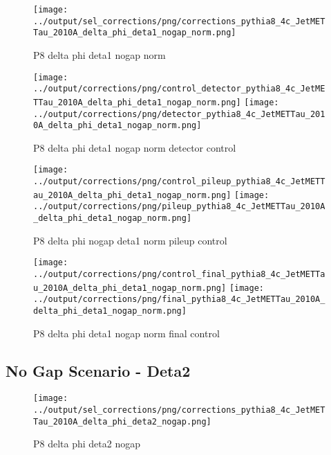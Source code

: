 \documentclass[11pt]{book}
\begin{document}
\begin{figure}[ht]
\centering
\texttt{[image: ../output/sel\_corrections/png/corrections\_pythia8\_4c\_JetMETTau\_2010A\_delta\_phi\_deta1\_nogap\_norm.png]}
\caption{P8 delta phi deta1 nogap norm}
\label{fig:p8_JetMETTau_2010A_delta_phi_deta1_nogap_norm}
\end{figure}

\begin{figure}[ht]
\centering
\texttt{[image: ../output/corrections/png/control\_detector\_pythia8\_4c\_JetMETTau\_2010A\_delta\_phi\_deta1\_nogap\_norm.png]}
\texttt{[image: ../output/corrections/png/detector\_pythia8\_4c\_JetMETTau\_2010A\_delta\_phi\_deta1\_nogap\_norm.png]}
\caption{P8 delta phi deta1 nogap norm detector control}
\label{fig:p8_JetMETTau_2010A_delta_phi_deta1_nogap_norm_detector_control}
\end{figure}

\begin{figure}[ht]
\centering
\texttt{[image: ../output/corrections/png/control\_pileup\_pythia8\_4c\_JetMETTau\_2010A\_delta\_phi\_deta1\_nogap\_norm.png]}
\texttt{[image: ../output/corrections/png/pileup\_pythia8\_4c\_JetMETTau\_2010A\_delta\_phi\_deta1\_nogap\_norm.png]}
\caption{P8 delta phi nogap deta1 norm pileup control}
\label{fig:p8_JetMETTau_2010A_delta_phi_deta1_nogap_norm_pileup_control}
\end{figure}


\begin{figure}[ht]
\centering
\texttt{[image: ../output/corrections/png/control\_final\_pythia8\_4c\_JetMETTau\_2010A\_delta\_phi\_deta1\_nogap\_norm.png]}
\texttt{[image: ../output/corrections/png/final\_pythia8\_4c\_JetMETTau\_2010A\_delta\_phi\_deta1\_nogap\_norm.png]}
\caption{P8 delta phi deta1 nogap norm final control}
\label{fig:p8_JetMETTau_2010A_delta_phi_deta1_nogap_norm_final_control}
\end{figure}


\clearpage
\subsection{No Gap Scenario - Deta2}
\begin{figure}[ht]
\centering
\texttt{[image: ../output/sel\_corrections/png/corrections\_pythia8\_4c\_JetMETTau\_2010A\_delta\_phi\_deta2\_nogap.png]}
\caption{P8 delta phi deta2 nogap}
\label{fig:p8_JetMETTau_2010A_delta_phi_deta2_nogap}
\end{figure}
\end{document}
